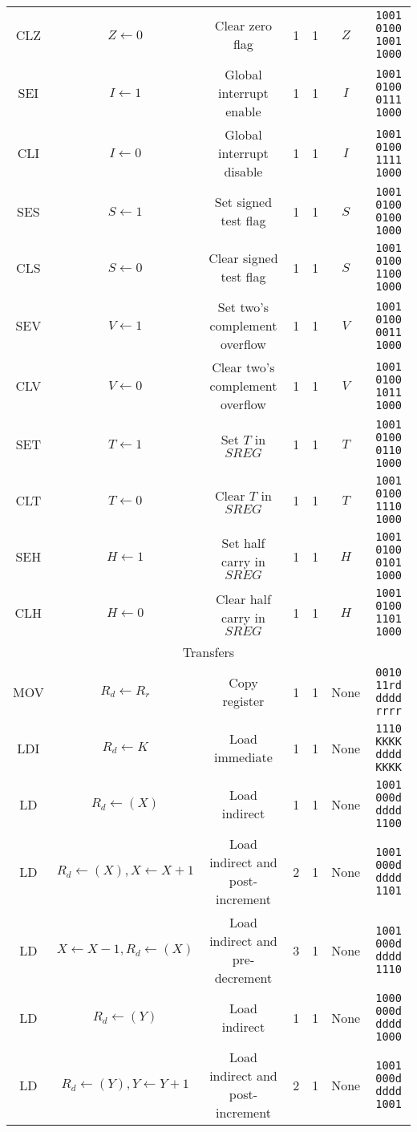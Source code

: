 \documentclass[11pt]{article}
\begin{document}
\begin{center}
\begin{longtable}{|c|c|c|c|c|c|c|}
CLZ & $Z \leftarrow 0$ & Clear zero flag & 1 & 1 & $Z$ & \texttt{1001 0100 1001 1000}\\
SEI & $I \leftarrow 1$ & Global interrupt enable & 1 & 1 & $I$ & \texttt{1001 0100 0111 1000}\\
CLI & $I \leftarrow 0$ & Global interrupt disable & 1 & 1 & $I$ & \texttt{1001 0100 1111 1000}\\
SES & $S \leftarrow 1$ & Set signed test flag & 1 & 1 & $S$ & \texttt{1001 0100 0100 1000}\\
CLS & $S \leftarrow 0$ & Clear signed test flag & 1 & 1 & $S$ & \texttt{1001 0100 1100 1000}\\
SEV & $V \leftarrow 1$ & Set two's complement overflow & 1 & 1 & $V$ & \texttt{1001 0100 0011 1000}\\
CLV & $V \leftarrow 0$ & Clear two's complement overflow & 1 & 1 & $V$ & \texttt{1001 0100 1011 1000}\\
SET & $T \leftarrow 1$ & Set $T$ in $SREG$ & 1 & 1 & $T$ & \texttt{1001 0100 0110 1000}\\
CLT & $T \leftarrow 0$ & Clear $T$ in $SREG$ & 1 & 1 & $T$ & \texttt{1001 0100 1110 1000}\\
SEH & $H \leftarrow 1$ & Set half carry in $SREG$ & 1 & 1 & $H$ & \texttt{1001 0100 0101 1000}\\
CLH & $H \leftarrow 0$ & Clear half carry in $SREG$ & 1 & 1 & $H$ & \texttt{1001 0100 1101 1000}\\
\hline\hline
\multicolumn{7}{|c|}{Transfers} \\
\hline
MOV & $R_d \leftarrow R_r$ & Copy register & 1 & 1 & None & \texttt{0010 11rd dddd rrrr}\\
LDI & $R_d \leftarrow K$ & Load immediate & 1 & 1 & None & \texttt{1110 KKKK dddd KKKK}\\
LD & $R_d \leftarrow (X)$ & Load indirect & 1 & 1 & None & \texttt{1001 000d dddd 1100}\\
LD & $R_d \leftarrow (X), X \leftarrow X + 1$ & Load indirect and post-increment & 2 & 1 & None & \texttt{1001 000d dddd 1101}\\
LD & $X \leftarrow X - 1, R_d \leftarrow (X)$ & Load indirect and pre-decrement & 3 & 1 & None & \texttt{1001 000d dddd 1110}\\
LD & $R_d \leftarrow (Y)$ & Load indirect & 1 & 1 & None & \texttt{1000 000d dddd 1000}\\
LD & $R_d \leftarrow (Y), Y \leftarrow Y + 1$ & Load indirect and post-increment & 2 & 1 & None & \texttt{1001 000d dddd 1001}\\

\end{longtable}
\end{center}
\end{document}
